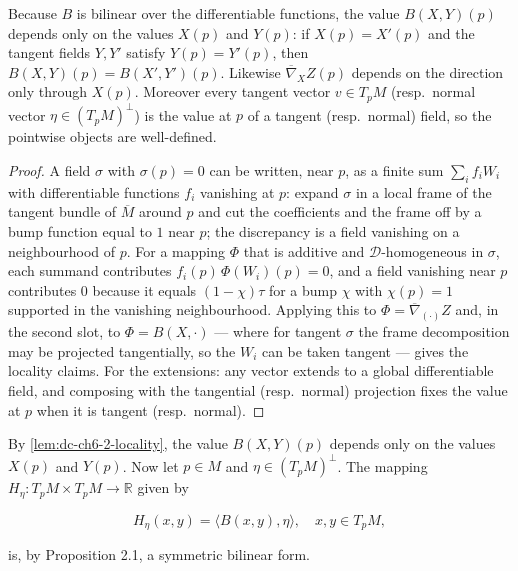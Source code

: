 \begin{lemma}
  \label{lem:dc-ch6-2-locality}


  Because $B$ is bilinear over the differentiable functions, the value
  $B(X,Y)(p)$ depends only on the values $X(p)$ and $Y(p)$: if $X(p)=X'(p)$ and
  the tangent fields $Y,Y'$ satisfy $Y(p)=Y'(p)$, then
  $B(X,Y)(p)=B(X',Y')(p)$. Likewise $\overline{\nabla}_XZ(p)$ depends on the
  direction only through $X(p)$. Moreover every tangent vector $v\in T_pM$
  (resp.\ normal vector $\eta\in(T_pM)^\perp$) is the value at $p$ of a tangent
  (resp.\ normal) field, so the pointwise objects are
  well-defined.
\end{lemma}
\begin{proof}

  \sketch
  A field $\sigma$ with $\sigma(p)=0$ can be written, near $p$, as a finite sum
  $\sum_i f_i W_i$ with differentiable functions $f_i$ vanishing at $p$: expand
  $\sigma$ in a local frame of the tangent bundle of $\overline{M}$ around $p$
  and cut the coefficients and the frame off by a bump function equal to $1$
  near $p$; the discrepancy is a field vanishing on a neighbourhood of $p$.
  For a mapping $\Phi$ that is additive and $\mathcal{D}$-homogeneous in
  $\sigma$, each summand contributes $f_i(p)\,\Phi(W_i)(p)=0$, and a field
  vanishing near $p$ contributes $0$ because it equals $(1-\chi)\tau$ for a
  bump $\chi$ with $\chi(p)=1$ supported in the vanishing neighbourhood.
  Applying this to $\Phi=\overline{\nabla}_{(\cdot)}Z$ and, in the second slot,
  to $\Phi=B(X,\cdot)$ — where for tangent $\sigma$ the frame decomposition
  may be projected tangentially, so the $W_i$ can be taken tangent — gives the
  locality claims. For the extensions: any vector extends to a global
  differentiable field, and composing with the tangential (resp.\ normal)
  projection fixes the value at $p$ when it is tangent (resp.\ normal).
\end{proof}

By \cref{lem:dc-ch6-2-locality}, the value $B(X,Y)(p)$ depends only on the
values $X(p)$ and $Y(p)$. Now let $p\in M$ and $\eta\in(T_pM)^\perp$. The
mapping $H_\eta:T_pM\times T_pM\to\mathbb{R}$ given by

$$
H_\eta(x,y)=\langle B(x,y),\eta\rangle,\quad x,y\in T_pM,
$$

is, by Proposition 2.1, a symmetric bilinear form.

